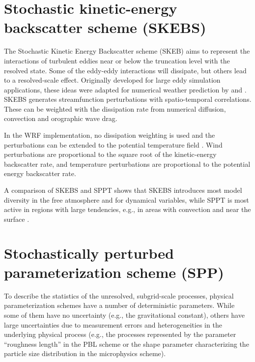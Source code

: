 \section{Stochastic kinetic-energy backscatter scheme (SKEBS)}
The Stochastic Kinetic Energy Backscatter scheme (SKEB) aims to represent
the interactions of turbulent eddies near or below the
truncation level with the resolved state. Some of the eddy-eddy interactions
will dissipate, but others lead to a resolved-scale effect.
Originally developed for large eddy simulation applications, these ideas were 
adapted for numerical weather prediction by
\citet{Sh05} and \citet{Be09}.
SKEBS generates streamfunction perturbations with spatio-temporal correlations. These
can be weighted with the dissipation rate from numerical diffusion, 
convection and orographic wave drag. 

In the WRF implementation, no dissipation weighting is used and the 
perturbations can be extended to the potential temperature field \citep{Be11}.
Wind perturbations are proportional to the square
root of the kinetic-energy backscatter rate, and temperature
perturbations are proportional to the potential energy backscatter rate.

A comparison of SKEBS and SPPT shows that SKEBS introduces most model diversity in the 
free atmosphere and for dynamical variables, 
while SPPT is most active in regions with large tendencies, e.g., in areas with convection 
and near the surface \citep{Be15}.
\section {Stochastically perturbed parameterization scheme (SPP)}
To describe the statistics of the unresolved, subgrid-scale processes, 
physical parameterization schemes have a number of deterministic parameters.
While some of them have no uncertainty (e.g., the gravitational constant), 
others have large uncertainties due to 
measurement errors and heterogeneities in the underlying physical process
(e.g., the processes represented by the parameter ``roughness length'' in the PBL 
scheme or the shape parameter characterizing the particle size distribution in 
the microphysics scheme).  

